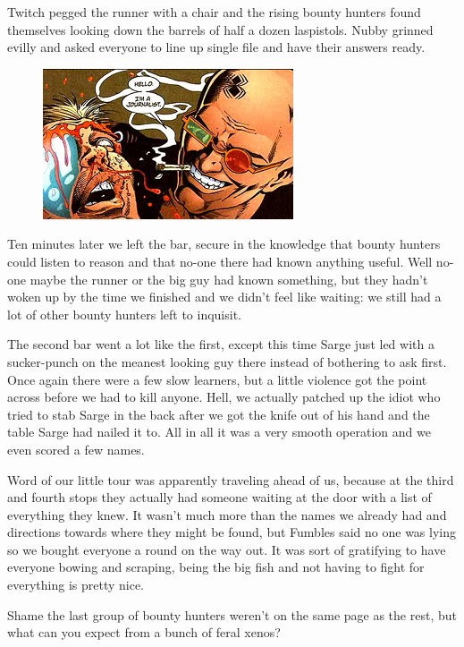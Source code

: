 Twitch pegged the runner with a chair and the rising bounty hunters found themselves looking down the barrels of half a dozen laspistols. 
Nubby grinned evilly and asked everyone to line up single file and have their answers ready.

\begin{figure}
	\begin{center}
		\includegraphics[width=\figwidth]{pics/10/23.png}
	\end{center}
\end{figure}
Ten minutes later we left the bar, secure in the knowledge that bounty hunters could listen to reason and that no-one there had known anything useful. 
Well no-one maybe the runner or the big guy had known something, but they hadn't woken up by the time we finished and we didn't feel like waiting: 
we still had a lot of other bounty hunters left to inquisit.

The second bar went a lot like the first, except this time Sarge just led with a sucker-punch on the meanest looking guy there instead of bothering to ask first. 
Once again there were a few slow learners, but a little violence got the point across before we had to kill anyone. 
Hell, we actually patched up the idiot who tried to stab Sarge in the back after we got the knife out of his hand and the table Sarge had nailed it to. 
All in all it was a very smooth operation and we even scored a few names.

Word of our little tour was apparently traveling ahead of us, because at the third and fourth stops they actually had someone waiting at the door with a list of everything they knew. 
It wasn't much more than the names we already had and directions towards where they might be found, but Fumbles said no one was lying so we bought everyone a round on the way out. 
It was sort of gratifying to have everyone bowing and scraping, being the big fish and not having to fight for everything is pretty nice. 


Shame the last group of bounty hunters weren't on the same page as the rest, but what can you expect from a bunch of feral xenos?

